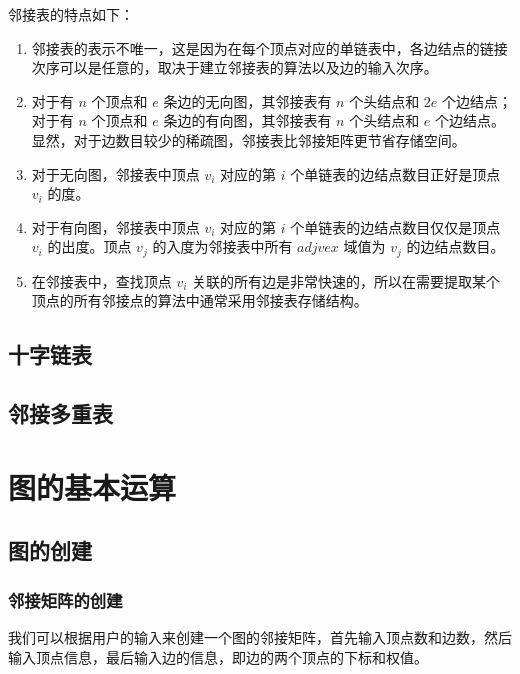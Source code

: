 \documentclass[lang=cn,newtx,10pt,scheme=chinese]{../elegantbook}
\begin{document}
邻接表的特点如下：

\begin{enumerate}
  \item 邻接表的表示不唯一，这是因为在每个顶点对应的单链表中，各边结点的链接次序可以是任意的，取决于建立邻接表的算法以及边的输入次序。
  
  \item 对于有 $n$ 个顶点和 $e$ 条边的无向图，其邻接表有 $n$ 个头结点和 $2e$ 个边结点；对于有 $n$ 个顶点和 $e$ 条边的有向图，其邻接表有 $n$ 个头结点和 $e$ 个边结点。显然，对于边数目较少的稀疏图，邻接表比邻接矩阵更节省存储空间。
  
  \item 对于无向图，邻接表中顶点 $v_i$ 对应的第 $i$ 个单链表的边结点数目正好是顶点 $v_i$ 的度。
  
  \item 对于有向图，邻接表中顶点 $v_i$ 对应的第 $i$ 个单链表的边结点数目仅仅是顶点 $v_i$ 的出度。顶点 $v_j$ 的入度为邻接表中所有 $adjvex$ 域值为 $v_j$ 的边结点数目。
  
  \item 在邻接表中，查找顶点 $v_i$ 关联的所有边是非常快速的，所以在需要提取某个顶点的所有邻接点的算法中通常采用邻接表存储结构。
\end{enumerate}
\subsection{十字链表}

\subsection{邻接多重表}

\section{图的基本运算}


\subsection{图的创建}

\subsubsection{邻接矩阵的创建}

我们可以根据用户的输入来创建一个图的邻接矩阵，首先输入顶点数和边数，然后输入顶点信息，最后输入边的信息，即边的两个顶点的下标和权值。
\end{document}
